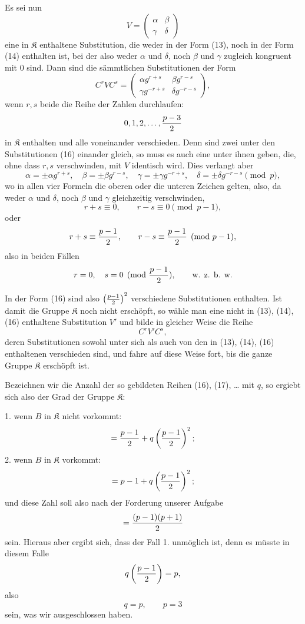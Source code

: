 \documentclass[11pt]{article}
\providecommand{\Kgrp}{\mathfrak K}
\begin{document}
Es sei nun
\begin{equation}
 V=\begin{pmatrix}\alpha&\beta\\ \gamma&\delta\end{pmatrix}
\tag{15}
\end{equation}
eine in $\Kgrp$ enthaltene Substitution, die weder in der Form (13), noch in der Form (14) enthalten ist, bei der also weder $\alpha$ und $\delta$, noch $\beta$ und $\gamma$ zugleich kongruent mit $0$ sind. Dann sind die sämmtlichen Substitutionen der Form
\begin{equation}
 C^rVC^s=
 \begin{pmatrix}
 \alpha g^{r+s} & \beta g^{r-s}\\
 \gamma g^{-r+s} & \delta g^{-r-s}
 \end{pmatrix},
\tag{16}
\end{equation}
wenn $r,s$ beide die Reihe der Zahlen durchlaufen:
\[
 0,1,2,\ldots,{p-3\over2}
\]
in $\Kgrp$ enthalten und alle voneinander verschieden. Denn sind zwei unter den Substitutionen (16) einander gleich, so muss es auch eine unter ihnen geben, die, ohne dass $r,s$ verschwinden, mit $V$ identisch wird. Dies verlangt aber
\[
 \alpha=\pm\alpha g^{r+s},\quad
 \beta=\pm\beta g^{r-s},\quad
 \gamma=\pm\gamma g^{-r+s},\quad
 \delta=\pm\delta g^{-r-s}\pmod p,
\]
wo in allen vier Formeln die oberen oder die unteren Zeichen gelten, also, da weder $\alpha$ und $\delta$, noch $\beta$ und $\gamma$ gleichzeitig verschwinden,
\[
 r+s\equiv0,\qquad r-s\equiv0\pmod{p-1},
\]
oder
\[
 r+s\equiv{p-1\over2},\qquad r-s\equiv{p-1\over2}\pmod{p-1},
\]
also in beiden Fällen
\[
 r=0,\quad s=0\pmod{{p-1\over2}},\qquad\text{w. z. b. w.}
\]

In der Form (16) sind also $\left({p-1\over2}\right)^2$ verschiedene Substitutionen enthalten. Ist damit die Gruppe $\Kgrp$ noch nicht erschöpft, so wähle man eine nicht in (13), (14), (16) enthaltene Substitution $V'$ und bilde in gleicher Weise die Reihe
\begin{equation}
 C^rV'C^s,
\tag{17}
\end{equation}
deren Substitutionen sowohl unter sich als auch von den in (13), (14), (16) enthaltenen verschieden sind, und fahre auf diese Weise fort, bis die ganze Gruppe $\Kgrp$ erschöpft ist.

Bezeichnen wir die Anzahl der so gebildeten Reihen (16), (17), \ldots{} mit $q$, so ergiebt sich also der Grad der Gruppe $\Kgrp$:

1. wenn $B$ in $\Kgrp$ nicht vorkommt:
\[
 ={p-1\over2}+q\left({p-1\over2}\right)^2;
\]
2. wenn $B$ in $\Kgrp$ vorkommt:
\[
 =p-1+q\left({p-1\over2}\right)^2;
\]
und diese Zahl soll also nach der Forderung unserer Aufgabe
\[
 ={(p-1)(p+1)\over2}
\]
sein. Hieraus aber ergibt sich, dass der Fall 1. unmöglich ist, denn es müsste in diesem Falle
\[
 q\left({p-1\over2}\right)=p,
\]
also
\[
 q=p,\qquad p=3
\]
sein, was wir ausgeschlossen haben.
\end{document}
